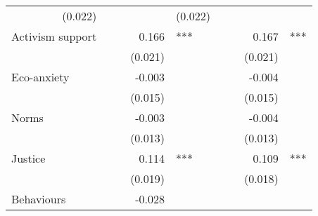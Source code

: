 \documentclass{article}
\begin{document}
\begin{table}[!h]
\begin{tabular}{lllllllll}
  \multicolumn{1}{r}{(0.022)} &
  \multicolumn{1}{l}{} &
  \multicolumn{1}{r}{} &
  \multicolumn{1}{l}{} &
  \multicolumn{1}{r}{(0.022)} &
  \multicolumn{1}{l}{} \\
\multicolumn{1}{l}{Activism support} &
  \multicolumn{1}{r}{} &
  \multicolumn{1}{l}{} &
  \multicolumn{1}{r}{0.166} &
  \multicolumn{1}{l}{***} &
  \multicolumn{1}{r}{} &
  \multicolumn{1}{l}{} &
  \multicolumn{1}{r}{0.167} &
  \multicolumn{1}{l}{***} \\
\multicolumn{1}{l}{} &
  \multicolumn{1}{r}{} &
  \multicolumn{1}{l}{} &
  \multicolumn{1}{r}{(0.021)} &
  \multicolumn{1}{l}{} &
  \multicolumn{1}{r}{} &
  \multicolumn{1}{l}{} &
  \multicolumn{1}{r}{(0.021)} &
  \multicolumn{1}{l}{} \\
\multicolumn{1}{l}{Eco-anxiety} &
  \multicolumn{1}{r}{} &
  \multicolumn{1}{l}{} &
  \multicolumn{1}{r}{-0.003} &
  \multicolumn{1}{l}{} &
  \multicolumn{1}{r}{} &
  \multicolumn{1}{l}{} &
  \multicolumn{1}{r}{-0.004} &
  \multicolumn{1}{l}{} \\
\multicolumn{1}{l}{} &
  \multicolumn{1}{r}{} &
  \multicolumn{1}{l}{} &
  \multicolumn{1}{r}{(0.015)} &
  \multicolumn{1}{l}{} &
  \multicolumn{1}{r}{} &
  \multicolumn{1}{l}{} &
  \multicolumn{1}{r}{(0.015)} &
  \multicolumn{1}{l}{} \\
\multicolumn{1}{l}{Norms} &
  \multicolumn{1}{r}{} &
  \multicolumn{1}{l}{} &
  \multicolumn{1}{r}{-0.003} &
  \multicolumn{1}{l}{} &
  \multicolumn{1}{r}{} &
  \multicolumn{1}{l}{} &
  \multicolumn{1}{r}{-0.004} &
  \multicolumn{1}{l}{} \\
\multicolumn{1}{l}{} &
  \multicolumn{1}{r}{} &
  \multicolumn{1}{l}{} &
  \multicolumn{1}{r}{(0.013)} &
  \multicolumn{1}{l}{} &
  \multicolumn{1}{r}{} &
  \multicolumn{1}{l}{} &
  \multicolumn{1}{r}{(0.013)} &
  \multicolumn{1}{l}{} \\
\multicolumn{1}{l}{Justice} &
  \multicolumn{1}{r}{} &
  \multicolumn{1}{l}{} &
  \multicolumn{1}{r}{0.114} &
  \multicolumn{1}{l}{***} &
  \multicolumn{1}{r}{} &
  \multicolumn{1}{l}{} &
  \multicolumn{1}{r}{0.109} &
  \multicolumn{1}{l}{***} \\
\multicolumn{1}{l}{} &
  \multicolumn{1}{r}{} &
  \multicolumn{1}{l}{} &
  \multicolumn{1}{r}{(0.019)} &
  \multicolumn{1}{l}{} &
  \multicolumn{1}{r}{} &
  \multicolumn{1}{l}{} &
  \multicolumn{1}{r}{(0.018)} &
  \multicolumn{1}{l}{} \\
\multicolumn{1}{l}{Behaviours} &
  \multicolumn{1}{r}{} &
  \multicolumn{1}{l}{} &
  \multicolumn{1}{r}{-0.028} &
  \multicolumn{1}{l}{} &

\end{tabular}
\end{table}
\end{document}
